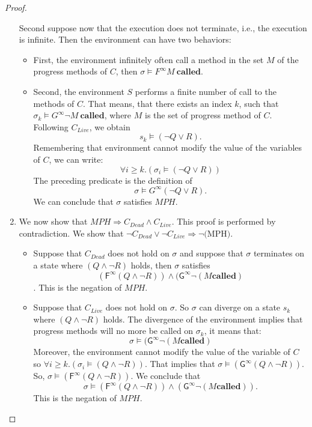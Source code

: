 \begin{proof}
\begin{enumerate}
      Second suppose now that the execution does not terminate, i.e., the
        execution is infinite. Then the environment can have two behaviors:
       \begin{itemize}
         \item First, the environment infinitely often call a method in the set
         $M$ of the progress methods of $C$, then 
         $\sigma \models F^{\infty} M~\mathbf{called}$. 
         \item Second, the environment $S$ performs a finite number of call
         to the methods of $C$. That means, that there exists an index $k$, 
         such that $\sigma_k \models G^{\infty} \neg M~\mathbf{called}$, where
         $M$ is the set of progress method of $C$. Following $C_{Live}$, 
         we obtain 
         $$s_k \models (\neg Q \vee R).$$  
         Remembering that environment cannot modify the value of the variables
         of $C$, we can write:
         $$ \forall i \geq k . (\sigma_i  \models (\neg Q \vee R))$$
         The preceding predicate is the definition of 
         $$ \sigma \models G^{\infty}(\neg Q \vee R).$$
         We can conclude that $\sigma$ satisfies $MPH$. 
       \end{itemize} 
 \item We now show that $MPH \Rightarrow  C_{Dead} \wedge C_{Live} $. This
proof is performed by contradiction. We 
show that $\neg C_{Dead} \vee \neg C_{Live} \Rightarrow \neg ($MPH$)$.
\begin{itemize}
\item Suppose that $C_{Dead}$ does not hold on $\sigma$ and suppose that 
$\sigma$ terminates on a state where $(Q \wedge \neg R)$ holds, then $\sigma$
satisfies $$(\mathsf{F}^{\infty}(Q \wedge \neg R)) 
\wedge (\mathsf{G^{\infty}} \neg (M \mathbf{called})$$. 
This is the negation of $MPH$.
\item Suppose that $C_{Live}$ does not hold on $\sigma$. So  
$\sigma$ can diverge on a state $s_k$ where $(Q \wedge \neg R)$ holds.
The divergence of the environment implies that progress methods will no more
be called on $\sigma_k$, it means that:
$$\sigma \models (\mathsf{G^{\infty}} \neg (M \mathbf{called})$$
Moreover, the environment cannot modify the value of the variable of $C$ so
 $ \forall i \geq k . (\sigma_i  \models (Q \wedge \neg R)).$
That implies that  $\sigma \models (\mathsf{G}^{\infty}(Q \wedge \neg R)).$
So, $\sigma \models (\mathsf{F}^{\infty}(Q \wedge \neg R)).$
We conclude that 
 $$\sigma \models (\mathsf{F}^{\infty}(Q \wedge \neg R)) 
\wedge (\mathsf{G^{\infty}} \neg (M \mathbf{called})).$$ 
This is the negation of $MPH$.
\end{itemize} 
\end{enumerate}
\end{proof}

